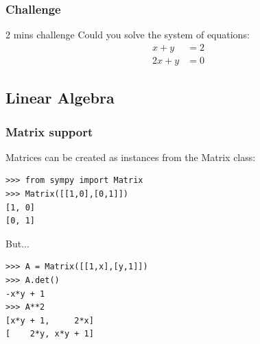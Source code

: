 \documentclass[10pt,colorlinks]{beamer}
\begin{document}
\begin{frame}[fragile]\frametitle{Challenge}
\begin{block}{2 mins challenge}
Could you solve the system of equations: 
\begin{align}
    x+y&=2 \\
    2x+y &= 0
\end{align}
\end{block}

\end{frame}



\subsection{Linear Algebra} %
\label{sub:Linear Algebra}
\begin{frame}[fragile]\frametitle{Matrix support}
Matrices can be created as instances from the Matrix class: 
\begin{verbatim}
>>> from sympy import Matrix
>>> Matrix([[1,0],[0,1]])
[1, 0]
[0, 1]
\end{verbatim}

But... 
\begin{verbatim}
>>> A = Matrix([[1,x],[y,1]])
>>> A.det()
-x*y + 1
>>> A**2
[x*y + 1,     2*x]
[    2*y, x*y + 1]
\end{verbatim}

\end{frame}

%


\end{document}
